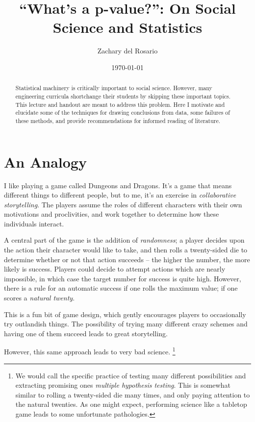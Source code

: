 \documentclass{tufte-handout}
\author{Zachary del Rosario}
\date{\today}
\title{``What's a p-value?'': On Social Science and Statistics}
\begin{document}
\maketitle
\begin{abstract}
\noindent
Statistical machinery is critically important to social science. However, many engineering
curricula shortchange their students by skipping these important topics. This lecture
and handout are meant to address this problem. Here I motivate and elucidate some of the
techniques for drawing conclusions from data, some failures of these methods, and
provide recommendations for informed reading of literature.
\end{abstract}

\section{An Analogy}
\label{sec:org5081cc4}
I like playing a game called Dungeons and Dragons.\cite{mearls2014} It's a game
that means different things to different people, but to me, it's an exercise in
\emph{collaborative storytelling}. The players assume the roles of different
characters with their own motivations and proclivities, and work together to
determine how these individuals interact.

A central part of the game is the addition of \emph{randomness}; a player decides
upon the action their character would like to take, and then rolls a
twenty-sided die to determine whether or not that action succeeds -- the higher
the number, the more likely is success. Players could decide to attempt actions
which are nearly impossible, in which case the target number for success is
quite high. However, there is a rule for an automatic success if one rolls the
maximum value; if one scores a \emph{natural twenty}.


This is a fun bit of game design, which gently encourages players to
occasionally try outlandish things. The possibility of trying many different
crazy schemes and having one of them succeed leads to great storytelling.

However, this same approach leads to very bad science. \footnote{We would call the
specific practice of testing many different possibilities and extracting
promising ones \emph{multiple hypothesis testing}. This is somewhat similar to
rolling a twenty-sided die many times, and only paying attention to the natural
twenties. As one might expect, performing science like a tabletop game leads to
some unfortunate pathologies.}
\end{document}
